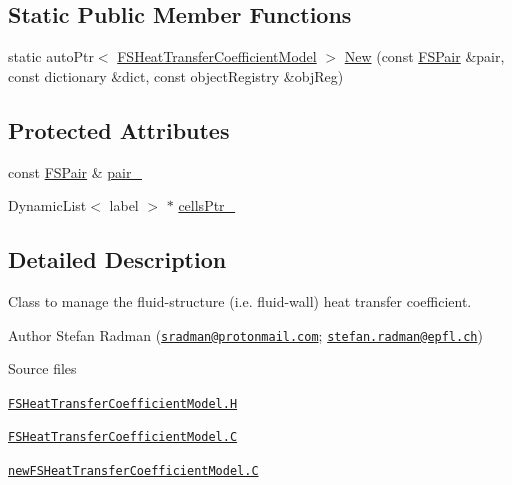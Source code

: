 \subsection*{Static Public Member Functions}
\begin{DoxyCompactItemize}
\item 
static auto\+Ptr$<$ \hyperlink{classFoam_1_1FSHeatTransferCoefficientModel}{F\+S\+Heat\+Transfer\+Coefficient\+Model} $>$ \hyperlink{classFoam_1_1FSHeatTransferCoefficientModel_a36b78812f386917072b03a36268d6bce}{New} (const \hyperlink{classFoam_1_1FSPair}{F\+S\+Pair} \&pair, const dictionary \&dict, const object\+Registry \&obj\+Reg)
\end{DoxyCompactItemize}
\subsection*{Protected Attributes}
\begin{DoxyCompactItemize}
\item 
const \hyperlink{classFoam_1_1FSPair}{F\+S\+Pair} \& \hyperlink{classFoam_1_1FSHeatTransferCoefficientModel_a587e19a1b4f4b498d2604d20c093a73b}{pair\+\_\+}
\item 
Dynamic\+List$<$ label $>$ $\ast$ \hyperlink{classFoam_1_1FSHeatTransferCoefficientModel_a737fc6c43e119dd399c1f4f972db6181}{cells\+Ptr\+\_\+}
\end{DoxyCompactItemize}


\subsection{Detailed Description}
Class to manage the fluid-\/structure (i.\+e. fluid-\/wall) heat transfer coefficient. 

\label{_Description}%
 Author Stefan Radman (\href{mailto:sradman@protonmail.com}{\tt sradman@protonmail.\+com}; \href{mailto:stefan.radman@epfl.ch}{\tt stefan.\+radman@epfl.\+ch})

\begin{DoxyParagraph}{Source files}

\begin{DoxyItemize}
\item \href{../../../home/carlo/data/GeN-Foam/GeN-Foam_ffn/GeN-Foam/GeN-Foam/classes/thermalHydraulics/src/physicsModels/heatTransferModels/FSHeatTransferCoefficientModels/FSHeatTransferCoefficientModel.H}{\tt F\+S\+Heat\+Transfer\+Coefficient\+Model.\+H} 
\item \href{../../../home/carlo/data/GeN-Foam/GeN-Foam_ffn/GeN-Foam/GeN-Foam/classes/thermalHydraulics/src/physicsModels/heatTransferModels/FSHeatTransferCoefficientModels/FSHeatTransferCoefficientModel.C}{\tt F\+S\+Heat\+Transfer\+Coefficient\+Model.\+C} 
\item \href{../../../home/carlo/data/GeN-Foam/GeN-Foam_ffn/GeN-Foam/GeN-Foam/classes/thermalHydraulics/src/physicsModels/heatTransferModels/FSHeatTransferCoefficientModels/newFSHeatTransferCoefficientModel.C}{\tt new\+F\+S\+Heat\+Transfer\+Coefficient\+Model.\+C} 
\end{DoxyItemize}
\end{DoxyParagraph}


